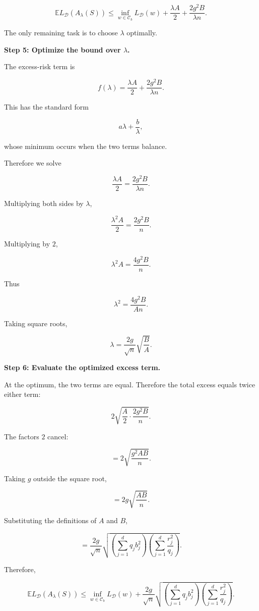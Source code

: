 \documentclass[11pt]{article}
\newcommand{\E}{\mathbb{E}}
\begin{document}
\begin{enumerate}
\begin{solutionbox}
\[
\E
L_{\mathcal D}(A_\lambda(S))
\le
\inf_{w\in\mathcal C_b}
L_{\mathcal D}(w)
+
\frac{\lambda A}{2}
+
\frac{2g^2B}{\lambda n}.
\]

The only remaining task is to choose \(\lambda\) optimally.

\medskip

\textbf{Step 5: Optimize the bound over \(\lambda\).}

The excess-risk term is

\[
f(\lambda)
=
\frac{\lambda A}{2}
+
\frac{2g^2B}{\lambda n}.
\]

This has the standard form

\[
a\lambda+\frac{b}{\lambda},
\]

whose minimum occurs when the two terms balance.

Therefore we solve

\[
\frac{\lambda A}{2}
=
\frac{2g^2B}{\lambda n}.
\]

Multiplying both sides by \(\lambda\),

\[
\frac{\lambda^2A}{2}
=
\frac{2g^2B}{n}.
\]

Multiplying by \(2\),

\[
\lambda^2A
=
\frac{4g^2B}{n}.
\]

Thus

\[
\lambda^2
=
\frac{4g^2B}{An}.
\]

Taking square roots,

\[
\boxed{
\lambda
=
\frac{2g}{\sqrt n}
\sqrt{\frac{B}{A}}.
}
\]

\medskip

\textbf{Step 6: Evaluate the optimized excess term.}

At the optimum, the two terms are equal. Therefore the total excess equals twice either term:

\[
2
\sqrt{
\frac{A}{2}
\cdot
\frac{2g^2B}{n}
}.
\]

The factors \(2\) cancel:

\[
=
2
\sqrt{
\frac{g^2AB}{n}
}.
\]

Taking \(g\) outside the square root,

\[
=
2g
\sqrt{
\frac{AB}{n}
}.
\]

Substituting the definitions of \(A\) and \(B\),

\[
=
\frac{2g}{\sqrt n}
\sqrt{
\left(
\sum_{j=1}^{d}
q_j b_j^2
\right)
\left(
\sum_{j=1}^{d}
\frac{r_j^2}{q_j}
\right)
}.
\]

Therefore,

\[
\boxed{
\E
L_{\mathcal D}(A_\lambda(S))
\le
\inf_{w\in\mathcal C_b}
L_{\mathcal D}(w)
+
\frac{2g}{\sqrt n}
\sqrt{
\left(
\sum_{j=1}^{d}
q_j b_j^2
\right)
\left(
\sum_{j=1}^{d}
\frac{r_j^2}{q_j}
\right)
}.
}
\]


\end{solutionbox}
\end{enumerate}
\end{document}
